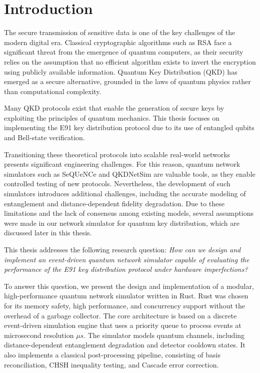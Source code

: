 \section{Introduction}\label{s:intro}

The secure transmission of sensitive data is one of the key challenges of the modern digital era. Classical cryptographic algorithms such as RSA \cite{rivest1978rsa} face a significant threat from the emergence of quantum computers, as their security relies on the assumption that no efficient algorithm exists to invert the encryption using publicly available information. Quantum Key Distribution (QKD) has emerged as a secure alternative, grounded in the laws of quantum physics rather than computational complexity.

Many QKD protocols exist \cite{aliro2025bbm92, sujay2023bb84, fujiwara2015e91} that enable the generation of secure keys by exploiting the principles of quantum mechanics. This thesis focuses on implementing the E91 key distribution protocol \cite{Ekert1991} due to its use of entangled qubits and Bell-state verification.

Transitioning these theoretical protocols into scalable real-world networks presents significant engineering challenges. For this reason, quantum network simulators such as SeQUeNCe \cite{wu2021sequence} and QKDNetSim \cite{mehic2022qkdnetsim} are valuable tools, as they enable controlled testing of new protocols. Nevertheless, the development of such simulators introduces additional challenges, including the accurate modeling of entanglement and distance-dependent fidelity degradation. Due to these limitations and the lack of consensus among existing models, several assumptions were made in our network simulator for quantum key distribution, which are discussed later in this thesis.

This thesis addresses the following research question:
\textit{How can we design and implement an event-driven quantum network simulator capable of evaluating the performance of the E91 key distribution protocol under hardware imperfections?}

To answer this question, we present the design and implementation of a modular, high-performance quantum network simulator written in Rust. Rust was chosen for its memory safety, high performance, and concurrency support without the overhead of a garbage collector. The core architecture is based on a discrete event-driven simulation engine that uses a priority queue to process events at microsecond resolution $\mu s$. The simulator models quantum channels, including distance-dependent entanglement degradation and detector cooldown states. It also implements a classical post-processing pipeline, consisting of basis reconciliation, CHSH inequality testing, and Cascade error correction.

